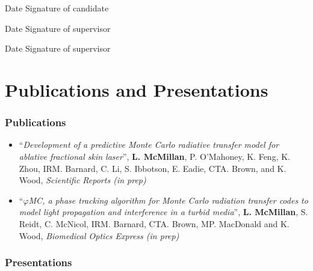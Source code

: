 \documentclass[10pt,a4paper,twoside]{book}
\begin{document}
\medskip

Date\dotfill \hspace{1cm} Signature of candidate \dotfill

\medskip

Date\dotfill \hspace{1cm} Signature of supervisor \dotfill

\medskip

\indent Date\dotfill \hspace{1cm} Signature of supervisor \dotfill

\chapter*{Publications and Presentations}
\subsection*{Publications}
\begin{itemize}

\item ``\textit{Development of a predictive Monte Carlo radiative transfer model for ablative fractional skin laser}'', \textbf{L. McMillan}, P. O'Mahoney, K. Feng, K. Zhou, IRM. Barnard, C. Li, S. Ibbotson, E. Eadie, CTA. Brown, and K. Wood, \textit{Scientific Reports (in prep)}

\item ``\textit{$\varphi$MC, a phase tracking algorithm for Monte Carlo radiation transfer codes to model light propagation and interference in a turbid media}'', \textbf{L. McMillan}, S. Reidt, C. McNicol, IRM. Barnard, CTA. Brown, MP. MacDonald and K. Wood, \textit{Biomedical Optics Express (in prep)}

\end{itemize}

\subsection*{Presentations}
\end{document}
